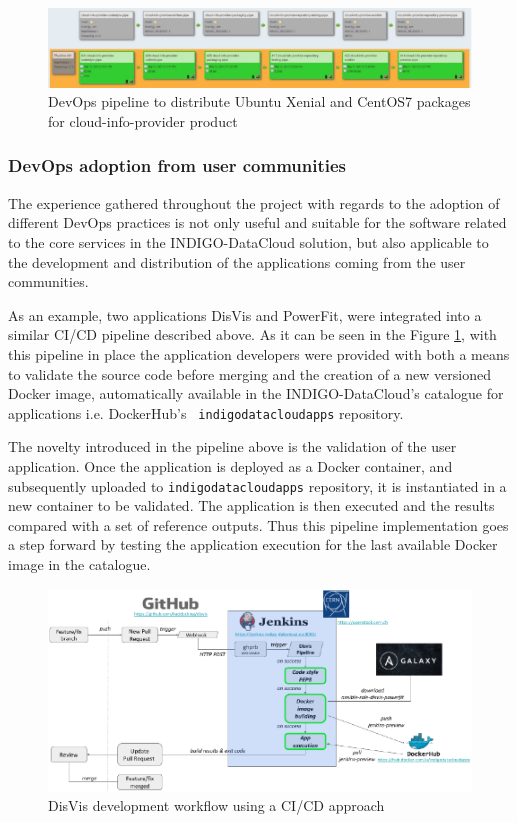 \documentclass{article}
\begin{document}
\begin{figure}
  \centering
  \includegraphics[width=\textwidth]{./figs/Figure15.pdf}
  \caption{DevOps pipeline to distribute Ubuntu Xenial and CentOS7 packages for cloud-info-provider product}
  \label{fig:15}
\end{figure}

\subsubsection{DevOps adoption from user communities}

The experience gathered throughout the project with regards to the adoption of
different DevOps practices is not only useful and suitable for the software
related to the core services in the INDIGO-DataCloud solution, but also
applicable to the development and distribution of the applications coming from
the user communities.

As an example, two applications DisVis and PowerFit, were integrated into a
similar CI/CD pipeline described above. As it can be seen in the Figure
\ref{fig:15}, with this pipeline in place the application developers were
provided with both a means to validate the source code before merging and the
creation of a new versioned Docker image, automatically available in the
INDIGO-DataCloud’s catalogue for applications i.e. DockerHub’s {\tt
indigodatacloudapps} repository.

The novelty introduced in the pipeline above is the validation of the user
application. Once the application is deployed as a Docker container, and
subsequently uploaded to {\tt indigodatacloudapps} repository, it is
instantiated in a new container to be validated. The application is then
executed and the results compared with a set of reference outputs. Thus this
pipeline implementation goes a step forward by testing the application
execution for the last available Docker image in the catalogue.

\begin{figure}
  \centering
  \includegraphics[width=\textwidth]{./figs/Figure16.pdf}
  \caption{DisVis development workflow using a CI/CD approach}
  \label{fig:16}
\end{figure}
\end{document}
